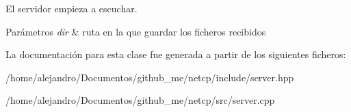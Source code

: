 El servidor empieza a escuchar. 


\begin{DoxyParams}{Parámetros}
{\em dir} & ruta en la que guardar los ficheros recibidos \\
\hline
\end{DoxyParams}


La documentación para esta clase fue generada a partir de los siguientes ficheros\+:\begin{DoxyCompactItemize}
\item 
/home/alejandro/\+Documentos/github\+\_\+me/netcp/include/server.\+hpp\item 
/home/alejandro/\+Documentos/github\+\_\+me/netcp/src/server.\+cpp\end{DoxyCompactItemize}
